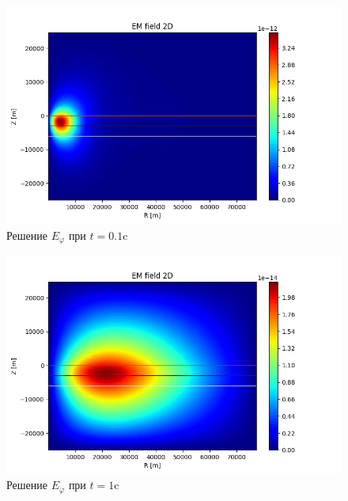 \begin{figure}
	\centering
	\vspace*{0.7cm}
	\includegraphics[width=0.95\linewidth]{images/Answer_E_time_layer_45.png}
	\caption{Решение $E_{\varphi}$ при $t = 0.1$c}
	\label{fig:E_phi_2}
\end{figure} 

\begin{figure}
	\centering
	\vspace*{0.7cm}
	\includegraphics[width=0.95\linewidth]{images/Answer_E_time_layer_60.png}
	\caption{Решение $E_{\varphi}$ при $t = 1$c}
	\label{fig:E_phi_3}
\end{figure} 

